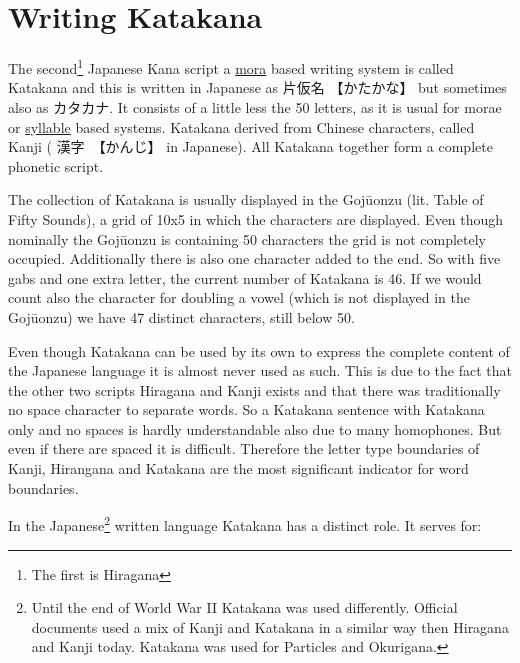 \chapter{Writing Katakana}

The second\footnote{The first is Hiragana} Japanese Kana script a
\hyperref[sec:Mora]{mora}  based writing system is called Katakana and this is
written in Japanese as {片仮名} {【かたかな】} but sometimes also as
{カタカナ}.  It consists of a little less the 50 letters, as it is usual for
morae or \hyperref[sec:Syllable]{syllable} based systems. Katakana derived from
Chinese characters, called Kanji ( {漢字}　{【かんじ】} in Japanese). All
Katakana together form a complete phonetic script.

The collection of Katakana is usually displayed in the Gojūonzu (lit. Table of
Fifty Sounds), a grid of 10x5 in which the characters are displayed. Even
though nominally the Gojūonzu is containing 50 characters the grid is not
completely occupied. Additionally there is also one character added to the
end. So with five gabs and one extra letter, the current number of Katakana is
46. If we would count also the character for doubling a vowel (which is not
displayed in the Gojūonzu) we have 47 distinct characters, still below 50. 



Even though Katakana can be used by its own to express the complete content of
the Japanese language it is almost never used as such. This is due to the fact
that the other two scripts Hiragana and Kanji exists and that there was
traditionally no space character to separate words. So a Katakana sentence with
Katakana only and no spaces is hardly understandable also due to many
homophones.  But even if there are spaced it is difficult. Therefore the letter
type boundaries of Kanji, Hirangana and Katakana are the most significant
indicator for word boundaries.

In the Japanese\footnote{Until the end of World War II Katakana was used
differently. Official documents used a mix of Kanji and Katakana in a similar
way then Hiragana and Kanji today. Katakana was used for Particles and
Okurigana.} written language Katakana has a distinct role. It serves for:


